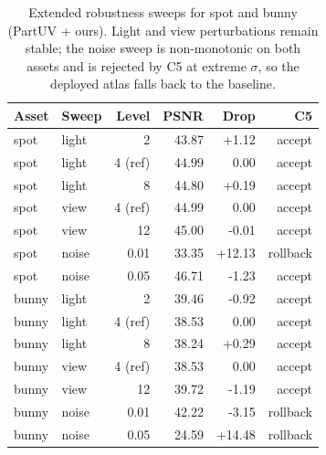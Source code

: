 \begin{table}[t]
\centering
\scriptsize
\caption{Extended robustness sweeps for spot and bunny (PartUV + ours). Light and view perturbations remain stable; the noise sweep is non-monotonic on both assets and is rejected by C5 at extreme $\sigma$, so the deployed atlas falls back to the baseline.}
\label{tab:robust_extended}
\begin{tabular}{@{}llrrrr@{}}
\toprule
Asset & Sweep & Level & PSNR & Drop & C5 \\
\midrule
spot & light & 2 & 43.87 & +1.12 & accept \\
spot & light & 4 (ref) & 44.99 & 0.00 & accept \\
spot & light & 8 & 44.80 & +0.19 & accept \\
spot & view & 4 (ref) & 44.99 & 0.00 & accept \\
spot & view & 12 & 45.00 & -0.01 & accept \\
spot & noise & 0.01 & 33.35 & +12.13 & rollback \\
spot & noise & 0.05 & 46.71 & -1.23 & accept \\
\midrule
bunny & light & 2 & 39.46 & -0.92 & accept \\
bunny & light & 4 (ref) & 38.53 & 0.00 & accept \\
bunny & light & 8 & 38.24 & +0.29 & accept \\
bunny & view & 4 (ref) & 38.53 & 0.00 & accept \\
bunny & view & 12 & 39.72 & -1.19 & accept \\
bunny & noise & 0.01 & 42.22 & -3.15 & rollback \\
bunny & noise & 0.05 & 24.59 & +14.48 & rollback \\
\bottomrule
\end{tabular}
\end{table}

